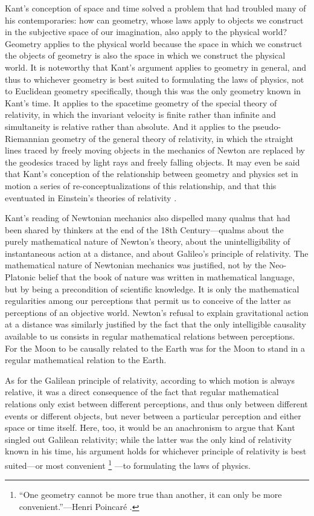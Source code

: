 \documentclass[12pt]{article}
\begin{document}
Kant's conception of space and time solved a problem that had troubled many of his contemporaries: how can geometry, whose laws apply to objects we construct in the subjective space of our imagination, also apply to the physical world? Geometry applies to the physical world because the space in which we construct the objects of geometry is also the space in which we construct the physical world. It is noteworthy that Kant's argument  applies to geometry in general, and thus to whichever geometry is best suited to formulating the laws of physics, not to Euclidean geometry specifically, though this was the only geometry known in Kant's time. It applies to the spacetime geometry of the special theory of relativity, in which the invariant velocity is finite rather than infinite and simultaneity is relative rather than absolute. And it applies to the pseudo-Riemannian geometry of the general theory of relativity, in which the straight lines traced by freely moving objects in the mechanics of Newton are replaced by the geodesics traced by light rays and freely falling objects. It may even be said that Kant's conception of the relationship between geometry and physics set in motion a series of re-conceptualizations of this relationship, and that this eventuated in Einstein's theories of relativity \cite{Friedman2009}.

Kant's reading of Newtonian mechanics also dispelled many qualms that had been shared by thinkers at the end of the 18th Century---qualms about the purely mathematical nature of Newton's theory, about the unintelligibility of instantaneous action at a distance, and about Galileo's principle of relativity. The mathematical nature of Newtonian mechanics was justified, not by the Neo-Platonic belief that the book of nature was written in mathematical language, but by being a precondition of scientific knowledge. It is only the mathematical regularities among our perceptions that permit us to conceive of the latter as perceptions of an objective world. Newton's refusal to explain gravitational action at a distance was similarly justified by the fact that the only intelligible causality available to us consists in regular mathematical relations between perceptions. For the Moon to be causally related to the Earth was for the Moon to stand in a regular mathematical relation to the Earth.

As for the Galilean principle of relativity, according to which motion is always relative, it was a direct consequence of the fact that regular mathematical relations only exist between different perceptions, and thus only between different events or different objects, but never between a particular perception and either space or time itself. Here, too, it would be an anachronism to argue that Kant singled out Galilean relativity; while the latter was the only kind of relativity known in his time, his argument holds for whichever principle of relativity is best suited---or most convenient%
\footnote{``One geometry cannot be more true than another, it can only be more convenient.''---Henri Poincar\'e \cite{Poincare1905}.}%
---to formulating the laws of physics.
\end{document}

